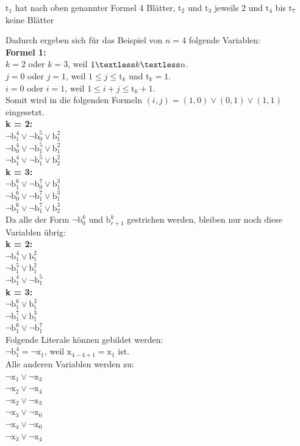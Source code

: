 \documentclass[a4,abstract=on]{scrartcl}
\begin{document}
$\text{t}_1$ hat nach oben genannter Formel 4 Blätter, $\text{t}_2$ und $\text{t}_3$ jeweils 2 und $\text{t}_4$ bis $\text{t}_7$ keine Blätter

Dadurch ergeben sich für das Beispiel von $n=4$ folgende Variablen:\\
\textbf{Formel 1:}\\
$k=2$ oder $k=3$, weil $1 \textless k \textless n$.\\
$j=0$ oder $j=1$, weil $1 \leq j \leq \text{t}_k$ und $\text{t}_k = 1$.\\
$i=0$ oder $i=1$, weil $1\leq i+j \leq \text{t}_{k}+1$.\\
Somit wird in die folgenden Formeln $(i,j) = (1,0) \vee (0,1) \vee (1,1)$ eingesetzt.\\
\textbf{k = 2:}\\
$\neg \text{b}_1^4 \vee \neg \text{b}_0^5 \vee \text{b}_1^2$\\
$\neg \text{b}_0^4 \vee \neg \text{b}_1^5 \vee \text{b}_1^2$\\
$\neg \text{b}_1^4 \vee \neg \text{b}_1^5 \vee \text{b}_2^2$\\
\textbf{k = 3:}\\
$\neg \text{b}_1^6 \vee \neg \text{b}_0^7 \vee \text{b}_1^3$\\
$\neg \text{b}_0^6 \vee \neg \text{b}_1^7 \vee \text{b}_1^3$\\
$\neg \text{b}_1^6 \vee \neg \text{b}_1^7 \vee \text{b}_2^3$\\

Da alle der Form $\neg \text{b}_0^k$ und $\text{b}_{r+1}^k$  gestrichen werden, bleiben nur noch diese Variablen übrig:\\
\textbf{k = 2:}\\
$\neg \text{b}_1^4  \vee \text{b}_1^2$\\
$\neg \text{b}_1^5 \vee \text{b}_1^2$\\
$\neg \text{b}_1^4 \vee \neg \text{b}_1^5$\\
\textbf{k = 3:}\\
$\neg \text{b}_1^6 \vee \text{b}_1^3$\\
$\neg \text{b}_1^7 \vee \text{b}_1^3$\\
$\neg \text{b}_1^6 \vee \neg \text{b}_1^7 $\\

Folgende Literale können gebildet werden:\\
$\neg \text{b}_1^4 = \neg \text{x}_1$, weil $\text{x}_{4-4+1}=\text{x}_1$ ist.\\
 Alle anderen Variablen werden zu:\\
$ \neg \text{x}_1 \vee \neg \text{x}_3$\\
$\neg \text{x}_2 \vee \neg \text{x}_4$\\
$\neg \text{x}_2 \vee \neg \text{x}_3$\\
$\neg \text{x}_3 \vee \neg \text{x}_0$\\
$\neg \text{x}_4 \vee \neg \text{x}_0$\\
$\neg \text{x}_3 \vee \neg \text{x}_4$\\
\end{document}
